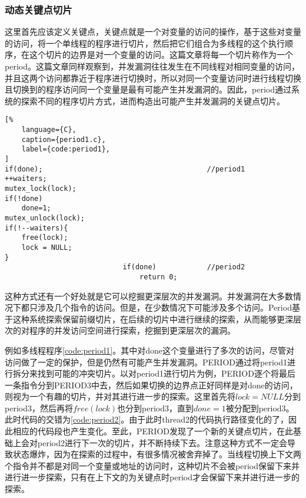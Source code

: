 \subsubsection{动态关键点切片}

这里首先应该定义关键点，关键点就是一个对变量的访问的操作，基于这些对变量的访问，将一个单线程的程序进行切片，然后把它们组合为多线程的这个执行顺序，在这个切片的边界是对一个变量的访问。这篇文章将每一个切片称作为一个period。这篇文章同样观察到，并发漏洞往往发生在不同线程对相同变量的访问，并且这两个访问都靠近于程序进行切换时，所以对同一个变量访问时进行线程切换且切换到的程序访问同一个变量是最有可能产生并发漏洞的。因此，period通过系统的探索不同的程序切片方式，进而构造出可能产生并发漏洞的关键点切片。

\begin{spacing}{1.0}
\begin{lstlisting}[%
    language={C},
    caption={period1.c},
    label={code:period1},
]
if(done);                                       //period1
++waiters;
mutex_lock(lock); 
if(!done) 
    done=1; 
mutex_unlock(lock); 
if(!--waiters){ 
    free(lock); 
    lock = NULL; 
} 
                            if(done)            //period2
                                return 0;
\end{lstlisting}
\end{spacing}

这种方式还有一个好处就是它可以挖掘更深层次的并发漏洞。并发漏洞在大多数情况下都只涉及几个指令的访问。但是，在少数情况下可能涉及多个访问。Period基于这种系统探索保留前缀切片，在后续的切片中进行继续的探索，从而能够更深层次的对程序的并发访问空间进行探索，挖掘到更深层次的漏洞。

例如多线程程序\autoref{code:period1}。其中对done这个变量进行了多次的访问，尽管对访问做了一定的保护，但是仍然有可能产生并发漏洞。PERIOD通过将period1进行拆分来找到可能的冲突切片。以对period1进行切片为例，PERIOD逐个将最后一条指令分到PERIOD3中去，然后如果切换的边界点正好同样是对done的访问，则视为一个有趣的切片，并对其进行进一步的探索。这里首先将$lock = NULL$分到period3，然后再将$free(lock)$也分到period3，直到$done = 1$被分配到period3。此时代码的交错为\autoref{code:period2}。由于此时thread2的代码执行路径变化的了，因此相应的代码段也产生变化。至此，PERIOD发现了一个新的关键点切片，在此基础上会对period2进行下一次的切片，并不断持续下去。注意这种方式不一定会导致状态爆炸，因为在探索的过程中，有很多情况被舍弃掉了。当线程切换上下文两个指令并不都是对同一个变量或地址的访问时，这种切片不会被period保留下来并进行进一步探索，只有在上下文的为关键点时period才会保留下来并进行进一步的探索。

